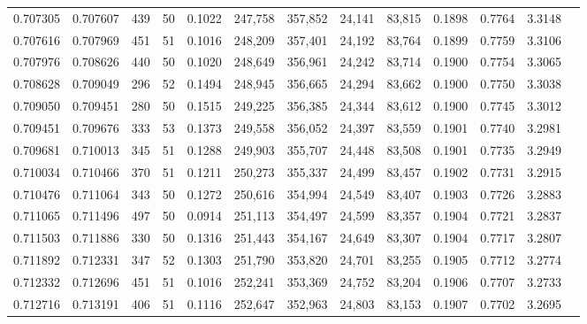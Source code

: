 \begin{tabular}{rrrrrrrrrrrrr}
0.707305 & 0.707607 &   439 &  50 &                                     0.1022 & 247,758 & 357,852 &  24,141 &  83,815 & 0.1898 & 0.7764 & 3.3148 \\
0.707616 & 0.707969 &   451 &  51 &                                     0.1016 & 248,209 & 357,401 &  24,192 &  83,764 & 0.1899 & 0.7759 & 3.3106 \\
0.707976 & 0.708626 &   440 &  50 &                                     0.1020 & 248,649 & 356,961 &  24,242 &  83,714 & 0.1900 & 0.7754 & 3.3065 \\
0.708628 & 0.709049 &   296 &  52 &                                     0.1494 & 248,945 & 356,665 &  24,294 &  83,662 & 0.1900 & 0.7750 & 3.3038 \\
0.709050 & 0.709451 &   280 &  50 &                                     0.1515 & 249,225 & 356,385 &  24,344 &  83,612 & 0.1900 & 0.7745 & 3.3012 \\
0.709451 & 0.709676 &   333 &  53 &                                     0.1373 & 249,558 & 356,052 &  24,397 &  83,559 & 0.1901 & 0.7740 & 3.2981 \\
0.709681 & 0.710013 &   345 &  51 &                                     0.1288 & 249,903 & 355,707 &  24,448 &  83,508 & 0.1901 & 0.7735 & 3.2949 \\
0.710034 & 0.710466 &   370 &  51 &                                     0.1211 & 250,273 & 355,337 &  24,499 &  83,457 & 0.1902 & 0.7731 & 3.2915 \\
0.710476 & 0.711064 &   343 &  50 &                                     0.1272 & 250,616 & 354,994 &  24,549 &  83,407 & 0.1903 & 0.7726 & 3.2883 \\
0.711065 & 0.711496 &   497 &  50 &                                     0.0914 & 251,113 & 354,497 &  24,599 &  83,357 & 0.1904 & 0.7721 & 3.2837 \\
0.711503 & 0.711886 &   330 &  50 &                                     0.1316 & 251,443 & 354,167 &  24,649 &  83,307 & 0.1904 & 0.7717 & 3.2807 \\
0.711892 & 0.712331 &   347 &  52 &                                     0.1303 & 251,790 & 353,820 &  24,701 &  83,255 & 0.1905 & 0.7712 & 3.2774 \\
0.712332 & 0.712696 &   451 &  51 &                                     0.1016 & 252,241 & 353,369 &  24,752 &  83,204 & 0.1906 & 0.7707 & 3.2733 \\
0.712716 & 0.713191 &   406 &  51 &                                     0.1116 & 252,647 & 352,963 &  24,803 &  83,153 & 0.1907 & 0.7702 & 3.2695 \\

\end{tabular}

